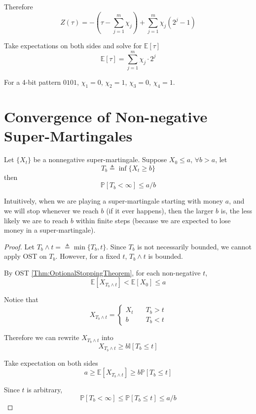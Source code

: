             Therefore
            \[Z(\tau) = -\left(\tau - \sum_{j=1}^m \chi_j\right) + \sum_{j=1}^m \chi_j(2^j-1)\]

            Take expectations on both sides and solve for $\mathbb{E}[\tau]$
            \[\mathbb{E}[\tau] = \sum_{j=1}^m\chi_j \cdot 2^j\]

            For a 4-bit pattern $0101$, $\chi_1=0$, $\chi_2 = 1$, $\chi_3=0$, $\chi_4=1$.


\section{Convergence of Non-negative Super-Martingales}
    \begin{proposition}\label{Prop:BoundOnSuperMartingale}
        Let $\{X_t\}$ be a nonnegative super-martingale. Suppose $X_0 \le a $, $\forall b > a$, let
        \[ T_b \triangleq \inf\{ X_t \ge b \} \]
        then
        \[ \mathbb{P}[T_b < \infty] \le a/b \]
    \end{proposition}

    Intuitively, when we are playing a super-martingale starting with money $a$, and we will stop whenever we reach $b$ (if it ever happens), then the larger $b$ is, the less likely we are to reach $b$ within finite steps (because we are expected to lose money in a super-martingale).

    \begin{proof}
        Let $T_b \wedge t =\triangleq \min\{T_b, t\}$. Since $T_b$ is not necessarily bounded, we cannot apply OST on $T_b$. However, for a fixed $t$, $T_b \wedge t$ is bounded.

        By OST \ref{Thm:OptionalStoppingTheorem}, for each non-negative $t$,
        \[ \mathbb{E}[X_{T_b \wedge t}] < \mathbb{E}[X_0] \le a \]

        Notice that
        \[ X_{T_b \wedge t} = \begin{cases}
            X_t &\quad T_b > t\\
            b &\quad T_b < t
        \end{cases} \]

        Therefore we can rewrite $X_{T_b \wedge t}$ into
        \[ X_{T_b \wedge t} \ge b\mathbb{I}[T_b \le t] \]

        Take expectation on both sides
        \[ a \ge \mathbb{E}[X_{T_b \wedge t}] \ge b\mathbb{P}[T_b \le t] \]

        Since $t$ is arbitrary,
        \[ \mathbb{P}[T_b < \infty] \le \mathbb{P}[T_b \le t] \le a/b \]
    \end{proof}


